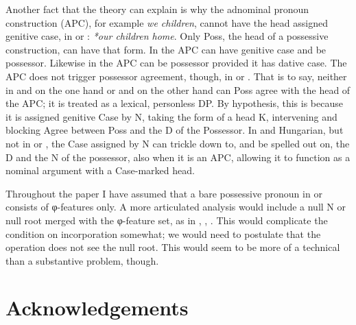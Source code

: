 \documentclass[output=paper]{langsci/langscibook}
\begin{document}
Another fact that the theory can explain is why the adnominal pronoun
construction (\gls{APC}), for example
\emph{we children}, cannot have the head assigned genitive
case, in  or : \emph{*our children home}. Only Poss, the head of
a possessive construction, can have that form. In  the APC can have
genitive case and be possessor. Likewise in  the
\gls{APC} can be possessor provided it has
dative case. The \gls{APC} does not trigger
possessor agreement, though, in  or . That is to say, neither
in  and  on the one hand or  and  on the other
hand can Poss agree with the head of the APC; it is treated as a lexical,
personless DP. By hypothesis, this is because it is assigned
genitive Case by N, taking the form of a head K, intervening
and blocking Agree between Poss and the D of the Possessor. In  and
Hungarian, but not in  or , the Case assigned by N can trickle
down to, and be spelled out on, the D and the N of the possessor, also when it
is an \gls{APC}, allowing it to function as
a nominal argument with a Case-marked head.

Throughout the paper I have assumed that a bare possessive pronoun in 
or  consists of φ-features only. A more articulated analysis would
include a null N or null root merged with the φ-feature set, as in
\citet{Panagiotidis2002}, \citet{Elbourne2008}, \citet{HolmbergPhimsawat2017}.
This would complicate the condition on incorporation somewhat; we would need to
postulate that the  operation does not see the null root. This
would seem to be more of a technical than a substantive problem, though.\largerpage

\printchapterglossary{}

\section*{Acknowledgements}
\end{document}
